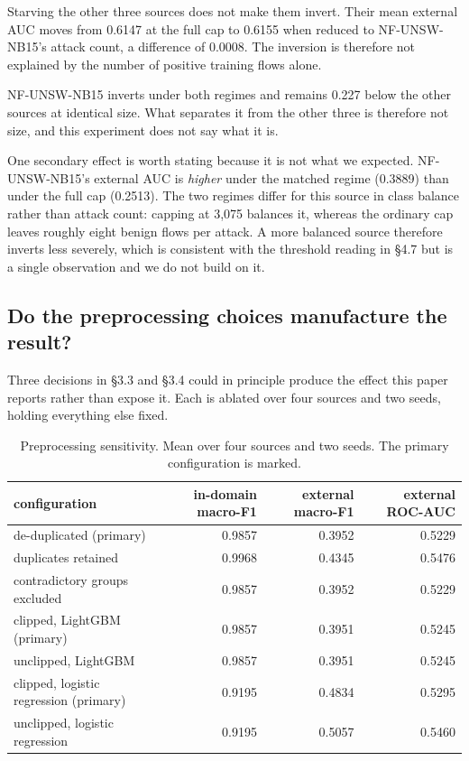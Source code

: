 \documentclass[11pt,a4paper]{article}
\begin{document}
Starving the other three sources does not make them invert. Their mean external AUC moves from 0.6147 at the full cap to 0.6155 when reduced to NF-UNSW-NB15's attack count, a difference of 0.0008. The inversion is therefore not explained by the number of positive training flows alone.

NF-UNSW-NB15 inverts under both regimes and remains 0.227 below the other sources at identical size. What separates it from the other three is therefore not size, and this experiment does not say what it is.

One secondary effect is worth stating because it is not what we expected. NF-UNSW-NB15's external AUC is \emph{higher} under the matched regime (0.3889) than under the full cap (0.2513). The two regimes differ for this source in class balance rather than attack count: capping at 3,075 balances it, whereas the ordinary cap leaves roughly eight benign flows per attack. A more balanced source therefore inverts less severely, which is consistent with the threshold reading in §4.7 but is a single observation and we do not build on it.

\subsection{Do the preprocessing choices manufacture the result?}

Three decisions in §3.3 and §3.4 could in principle produce the effect this paper reports rather than expose it. Each is ablated over four sources and two seeds, holding everything else fixed.

\begin{table}[htbp]\centering\small
\caption{Preprocessing sensitivity. Mean over four sources and two seeds. The primary configuration is marked.}
\begin{tabular}{lrrr}
\toprule
configuration & in-domain macro-F1 & external macro-F1 & external ROC-AUC \\
\midrule
de-duplicated (primary) & 0.9857 & 0.3952 & 0.5229 \\
duplicates retained & 0.9968 & 0.4345 & 0.5476 \\
contradictory groups excluded & 0.9857 & 0.3952 & 0.5229 \\
clipped, LightGBM (primary) & 0.9857 & 0.3951 & 0.5245 \\
unclipped, LightGBM & 0.9857 & 0.3951 & 0.5245 \\
clipped, logistic regression (primary) & 0.9195 & 0.4834 & 0.5295 \\
unclipped, logistic regression & 0.9195 & 0.5057 & 0.5460 \\
\bottomrule
\end{tabular}
\end{table}
\end{document}
